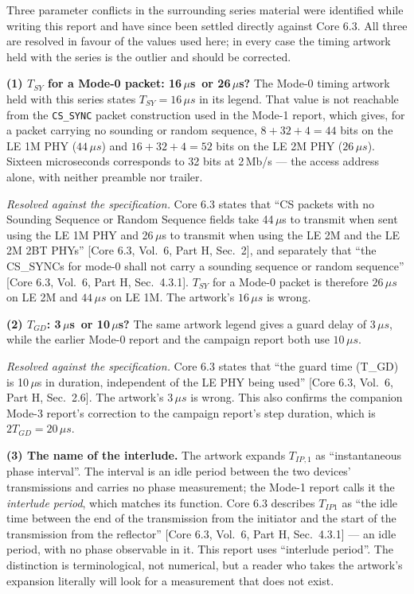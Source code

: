 \documentclass[11pt,a4paper]{article}
\newcommand{\us}{\,\ensuremath{\upmu}s}
\newcommand{\Tsy}{T_{SY}}
\newcommand{\Tgd}{T_{GD}}
\newcommand{\code}[1]{\texttt{\small #1}}
\providecommand{\upmu}{\mu}
\newcommand{\core}[1]{\textcolor{rulegrey}{\small[Core 6.3, #1]}}
\begin{document}
Three parameter conflicts in the surrounding series material were identified while writing this
report and have since been settled directly against Core 6.3. All three are resolved in favour of the
values used here; in every case the timing artwork held with the series is the outlier and should be
corrected.

\begin{caution}
\textbf{(1) $\Tsy$ for a Mode-0 packet: 16\us\ or 26\us?} The Mode-0 timing artwork held with this
series states $\Tsy = 16\us$ in its legend. That value is not reachable from the \code{CS\_SYNC}
packet construction used in the Mode-1 report, which gives, for a packet carrying no sounding or
random sequence, $8+32+4 = 44$ bits on the LE 1M PHY ($44\us$) and $16+32+4 = 52$ bits on the LE 2M
PHY ($26\us$). Sixteen microseconds corresponds to 32 bits at 2\,Mb/s --- the access address alone,
with neither preamble nor trailer.

\emph{Resolved against the specification.} Core 6.3 states that ``CS packets with no Sounding
Sequence or Random Sequence fields take 44\,\ensuremath{\upmu}s to transmit when sent using the LE 1M
PHY and 26\,\ensuremath{\upmu}s to transmit when using the LE 2M and the LE 2M 2BT PHYs''
\core{Vol.\ 6, Part H, Sec.\ 2}, and separately that ``the CS\_SYNCs for mode-0 shall not carry a
sounding sequence or random sequence'' \core{Vol.\ 6, Part H, Sec.\ 4.3.1}. $\Tsy$ for a Mode-0 packet
is therefore $26\us$ on LE 2M and $44\us$ on LE 1M. The artwork's $16\us$ is wrong.
\end{caution}

\begin{caution}
\textbf{(2) $\Tgd$: 3\us\ or 10\us?} The same artwork legend gives a guard delay of $3\us$, while the
earlier Mode-0 report and the campaign report both use $10\us$.

\emph{Resolved against the specification.} Core 6.3 states that ``the guard time (T\_GD) is
10\,\ensuremath{\upmu}s in duration, independent of the LE PHY being used''
\core{Vol.\ 6, Part H, Sec.\ 2.6}. The artwork's $3\us$ is wrong. This also confirms the companion
Mode-3 report's correction to the campaign report's step duration, which is $2\Tgd = 20\us$.
\end{caution}

\begin{caution}
\textbf{(3) The name of the interlude.} The artwork expands $T_{IP,1}$ as ``instantaneous phase
interval''. The interval is an idle period between the two devices' transmissions and carries no
phase measurement; the Mode-1 report calls it the \emph{interlude period}, which matches its
function. Core 6.3 describes $T_{IP1}$ as ``the idle time between the end of the transmission from
the initiator and the start of the transmission from the reflector''
\core{Vol.\ 6, Part H, Sec.\ 4.3.1} --- an idle period, with no phase observable in it. This report
uses ``interlude period''. The distinction is terminological, not numerical, but a reader who takes
the artwork's expansion literally will look for a measurement that does not exist.
\end{caution}
\end{document}

